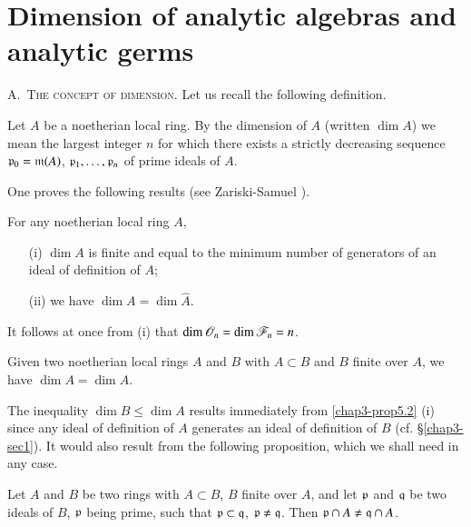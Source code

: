 \section{Dimension of analytic algebras and analytic germs}

A.~\textsc{The concept of dimension.} Let us recall the following definition.

\begin{definition}\label{chap3-defi5.1}
Let $A$ be a noetherian local ring. By the dimension of $A$ (written $\dim A$) we mean the largest integer $n$ for which there exists a strictly decreasing sequence $\mathfrak{p}_{0}=\mathfrak{m}(A)$, $\mathfrak{p}_{1},\ldots,\mathfrak{p}_{n}$ of prime ideals of $A$.
\end{definition}

One proves the following results (see Zariski-Samuel \cite{O. Zariski and P. Samuel : 1}).

\begin{proposition}\label{chap3-prop5.2}
For any noetherian local ring $A$,
\begin{itemize}
\item[(i)] $\dim A$ is finite and equal to the minimum number of generators of an ideal of definition of $A$;

\item[(ii)] we have $\dim A=\dim \widehat{A}$.
\end{itemize}

It follows at once from (i) that $\dim\mathscr{O}_{n}=\dim \mathscr{F}_{n}=n$.
\end{proposition}

\begin{theorem}\label{chap3-thm5.3}
Given two noetherian local rings $A$ and $B$ with $A\subset B$ and $B$ finite over $A$, we have $\dim A=\dim A$.
\end{theorem}

The inequality $\dim B\leq \dim A$ results immediately from \ref{chap3-prop5.2} (i) since any ideal of definition of $A$ generates an ideal of definition of $B$ (cf. \S\ref{chap3-sec1}). It would also result from the following proposition, which we shall need in any case.

\begin{proposition}\label{chap3-prop5.4}
Let $A$ and $B$ be two rings with $A\subset B$, $B$ finite over $A$, and let $\mathfrak{p}$ and $\mathfrak{q}$ be two ideals of $B$, $\mathfrak{p}$ being prime, such that $\mathfrak{p}\subset\mathfrak{q}$, $\mathfrak{p}\neq \mathfrak{q}$. Then $\mathfrak{p}\cap A\neq \mathfrak{q}\cap A$.
\end{proposition}

